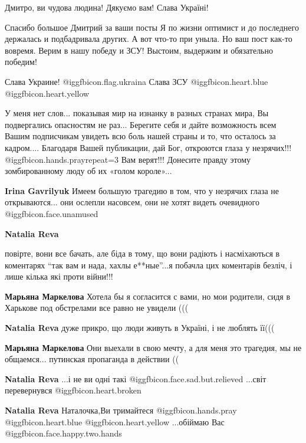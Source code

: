 \begin{itemize}
Дмитро, ви чудова людина! Дякуємо вам! Слава Україні!


Спасибо большое Дмитрий за ваши посты Я по жизни оптимист и до последнего
держалась и подбадривала других. А вот что-то при уныла. Но ваш пост как-то
вовремя. Верим в нашу победу и ЗСУ! Выстоим, выдержим и
обязательно победим!

Слава Украине! @igg{fbicon.flag.ukraina}
Слава ЗСУ @igg{fbicon.heart.blue}  @igg{fbicon.heart.yellow} 


У меня нет слов... показывая мир на изнанку в разных странах мира, Вы
подвергались опасностям не раз... Берегите себя и дайте возможность всем Вашим
подписчикам увидеть всю боль нашей страны и то, что осталось за кадром....
Благодаря Вашей публикации, дай Бог, откроются глаза у незрячих!!!  @igg{fbicon.hands.pray}{repeat=3}  Вам
верят!!! Донесите правду этому зомбированному люду об их «голом короле»...

\begin{itemize} %
\textbf{Irina Gavrilyuk} Имеем большую трагедию в том, что у незрячих глаза не открываются... они ослепли насовсем, они не хотят видеть очевидного  @igg{fbicon.face.unamused} 

\textbf{Natalia Reva} 

повірте, вони все бачать, але біда в тому, що вони радіють і насміхаються в
коментарях \enquote{так вам и нада, хахлы е**ные}...я побачла цих коментарів безліч, і
лише кілька які проти війни!!!

\textbf{Марьяна Маркелова} Хотела бы я согласится с вами, но мои родители, сидя в Харькове под обстрелами все равно не увидели (((

\textbf{Natalia Reva} дуже прикро, що люди живуть в Україні, і не люблять її(((

\textbf{Марьяна Маркелова} Они выехали в свою мечту, а для меня это трагедия, мы не общаемся... путинская пропаганда в действии ((

\textbf{Natalia Reva} ...і не ви одні такі @igg{fbicon.face.sad.but.relieved} ...світ перевернувся @igg{fbicon.heart.broken} 

\textbf{Natalia Reva} Наталочка,Ви тримайтеся @igg{fbicon.hands.pray}  @igg{fbicon.heart.blue}  @igg{fbicon.heart.yellow} ...обіймаю Вас @igg{fbicon.face.happy.two.hands} 


\end{itemize}
\end{itemize}
